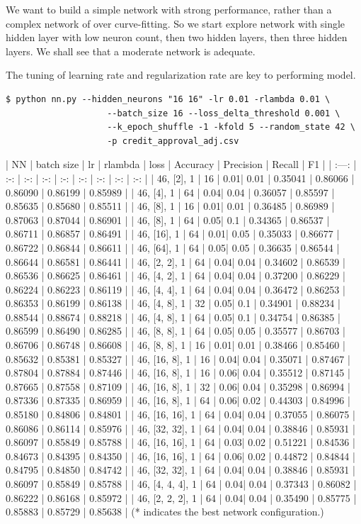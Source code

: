 We want to build a simple network with strong performance, rather than a complex network of over curve-fitting. So we start explore network with single hidden layer with low neuron count, then two hidden layers, then three hidden layers. We shall see that a moderate network is adequate. 

The tuning of learning rate and regularization rate are key to performing model.  


\begin{verbatim}
$ python nn.py --hidden_neurons "16 16" -lr 0.01 -rlambda 0.01 \
                    --batch_size 16 --loss_delta_threshold 0.001 \
                    --k_epoch_shuffle -1 -kfold 5 --random_state 42 \
                    -p credit_approval_adj.csv

\end{verbatim}


| NN | batch size | lr | rlambda | loss | Accuracy | Precision | Recall | F1 |
| :---: | :-: | :-: | :-: | :-: | :-: | :-: | :-: | :-: |
| 46, [2], 1 | 16 | 0.01| 0.01 | 0.35041 | 0.86066 | 0.86090 | 0.86199 | 0.85989 |
| 46, [4], 1 | 64 | 0.04| 0.04 | 0.36057 | 0.85597 | 0.85635 | 0.85680 | 0.85511 |
| 46, [8], 1 | 16 | 0.01| 0.01 | 0.36485 | 0.86989 | 0.87063 | 0.87044 | 0.86901 |
| 46, [8], 1 | 64 | 0.05| 0.1 | 0.34365 | 0.86537 | 0.86711 | 0.86857 | 0.86491 |
| 46, [16], 1 | 64 | 0.01| 0.05 | 0.35033 | 0.86677 | 0.86722 | 0.86844 | 0.86611 |
| 46, [64], 1 | 64 | 0.05| 0.05 | 0.36635 | 0.86544 | 0.86644 | 0.86581 | 0.86441 |
| 46, [2, 2], 1 | 64 | 0.04| 0.04 | 0.34602 | 0.86539 | 0.86536 | 0.86625 | 0.86461 |
| 46, [4, 2], 1 | 64 | 0.04| 0.04 | 0.37200 | 0.86229 | 0.86224 | 0.86223 | 0.86119 |
| 46, [4, 4], 1 | 64 | 0.04| 0.04 | 0.36472 | 0.86253 | 0.86353 | 0.86199 | 0.86138 |
| 46, [4, 8], 1 | 32 | 0.05| 0.1 | 0.34901 | 0.88234 | 0.88544 | 0.88674 | 0.88218 |
| 46, [4, 8], 1 | 64 | 0.05| 0.1 | 0.34754 | 0.86385 | 0.86599 | 0.86490 | 0.86285 |
| 46, [8, 8], 1 | 64 | 0.05| 0.05 | 0.35577 | 0.86703 | 0.86706 | 0.86748 | 0.86608 |
| 46, [8, 8], 1 | 16 | 0.01| 0.01 | 0.38466 | 0.85460 | 0.85632 | 0.85381 | 0.85327 |
| 46, [16, 8], 1 | 16 | 0.04| 0.04 | 0.35071 | 0.87467 | 0.87804 | 0.87884 | 0.87446 |
| 46, [16, 8], 1 | 16 | 0.06| 0.04 | 0.35512 | 0.87145 | 0.87665 | 0.87558 | 0.87109 |
| 46, [16, 8], 1 | 32 | 0.06| 0.04 | 0.35298 | 0.86994 | 0.87336 | 0.87335 | 0.86959 |
| 46, [16, 8], 1 | 64 | 0.06| 0.02 | 0.44303 | 0.84996 | 0.85180 | 0.84806 | 0.84801 |
| 46, [16, 16], 1 | 64 | 0.04| 0.04 | 0.37055 | 0.86075 | 0.86086 | 0.86114 | 0.85976 |
| 46, [32, 32], 1 | 64 | 0.04| 0.04 | 0.38846 | 0.85931 | 0.86097 | 0.85849 | 0.85788 |
| 46, [16, 16], 1 | 64 | 0.03| 0.02 | 0.51221 | 0.84536 | 0.84673 | 0.84395 | 0.84350 |
| 46, [16, 16], 1 | 64 | 0.06| 0.02 | 0.44872 | 0.84844 | 0.84795 | 0.84850 | 0.84742 |
| 46, [32, 32], 1 | 64 | 0.04| 0.04 | 0.38846 | 0.85931 | 0.86097 | 0.85849 | 0.85788 |
| 46, [4, 4, 4], 1 | 64 | 0.04| 0.04 | 0.37343 | 0.86082 | 0.86222 | 0.86168 | 0.85972 |
| 46, [2, 2, 2], 1 | 64 | 0.04| 0.04 | 0.35490 | 0.85775 | 0.85883 | 0.85729 | 0.85638 |
(* indicates the best network configuration.)


